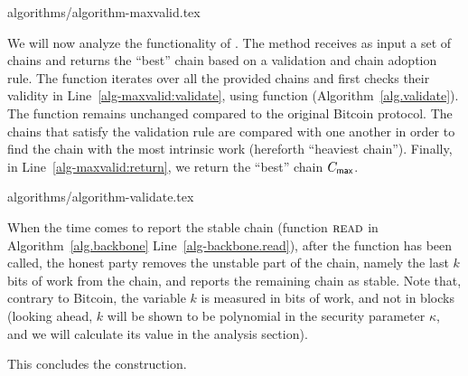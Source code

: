 {algorithms/algorithm-maxvalid.tex}

We will now analyze the functionality of \maxvalid. The method receives as input
a set of chains and returns the ``best'' chain based on a validation and
chain adoption rule. The function iterates over all the provided chains
and first checks their validity in Line~\ref{alg-maxvalid:validate}, using
function \validate (Algorithm~\ref{alg.validate}). The \validate function remains unchanged compared to
the original Bitcoin protocol.
The chains that satisfy the validation rule
are compared with one another in order to find the chain
with the most intrinsic work (hereforth ``heaviest chain'').
Finally, in Line~\ref{alg-maxvalid:return}, we return the
``best'' chain $C_{\textsf{max}}$.

{algorithms/algorithm-validate.tex}

When the time comes to report the stable chain
(function $\textsc{read}$ in Algorithm~\ref{alg.backbone} Line~\ref{alg-backbone.read}),
after the function \execute has been called,
the honest party removes the unstable part of the chain, namely
the last $k$ bits of work from the chain, and reports
the remaining chain as stable. Note that, contrary to Bitcoin,
the variable $k$ is measured in bits of work, and not in blocks
(looking ahead, $k$ will be shown to be polynomial in the
security parameter $\kappa$, and we will calculate its value
in the analysis section).

This concludes the \poem construction.

